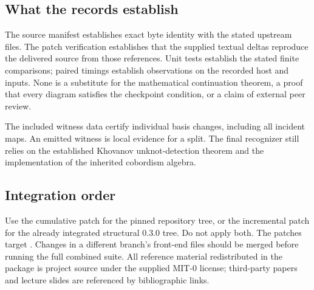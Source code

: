\subsection{What the records establish}
The source manifest establishes exact byte identity with the stated upstream
files. The patch verification establishes that the supplied textual deltas
reproduce the delivered source from those references. Unit tests establish
the stated finite comparisons; paired timings establish observations on the
recorded host and inputs. None is a substitute for the mathematical
continuation theorem, a proof that every diagram satisfies the checkpoint
condition, or a claim of external peer review.

The included witness data certify individual basis changes, including all
incident maps. An emitted witness is local evidence for a split. The final
recognizer still relies on the established Khovanov unknot-detection theorem
and the implementation of the inherited cobordism algebra.

\subsection{Integration order}
Use the cumulative patch for the pinned repository tree, or the incremental
patch for the already integrated structural 0.3.0 tree. Do not apply both.
The patches target . Changes in a
different branch's front-end files should be merged before running the full
combined suite. All reference material redistributed in the package is
project source under the supplied MIT-0 license; third-party papers and
lecture slides are referenced by bibliographic links.
